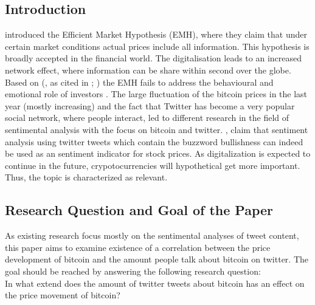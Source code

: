 \documentclass[a4paper,american,12pt]{article}
\begin{document}
\begin{spacing}{1.2}
\cleardoublepage{}
\section{Introduction}
\label{sec:intro}
\textcite[p.~388]{malkiel1970efficient} introduced the Efficient Market Hypothesis (EMH), where they claim that under certain market conditions actual prices include all information. This hypothesis is broadly accepted in the financial world. The digitalisation leads to an increased network effect, where information can be share within second over the globe. Based on \citeauthor{mao2015quantifying} (\citeyear[][p.~3]{mao2015quantifying}, as cited in \cite[][pp.~TBD]{shiller2015irrational}; \cite[][pp.~TBD]{kahneman2013prospect}) the EMH fails to address the behavioural and emotional role of investors . The large fluctuation of the bitcoin prices in the last year (mostly increasing) and the fact that Twitter has become a very popular social network, where people interact, led to different research in the field of sentimental analysis with the focus on bitcoin and twitter. \textcite[p.~18]{mao2015quantifying}, claim that sentiment analysis using twitter tweets which contain the buzzword bullishness can indeed be used as an sentiment indicator for stock prices. As digitalization is expected to continue in the future, crypotocurrencies will hypothetical get more important. Thus, the topic is characterized as relevant.

\subsection{Research Question and Goal of the Paper}
\label{sec:ResearchQandGoal}
As existing research focus mostly on the sentimental analyses of tweet content, this paper aims to examine existence of a correlation between the price development of bitcoin and the amount people talk about bitcoin on twitter. The goal should be reached by answering the following research question: \\
In what extend does the amount of twitter tweets about bitcoin has an effect on the price movement of bitcoin?


\end{spacing}
\end{document}
